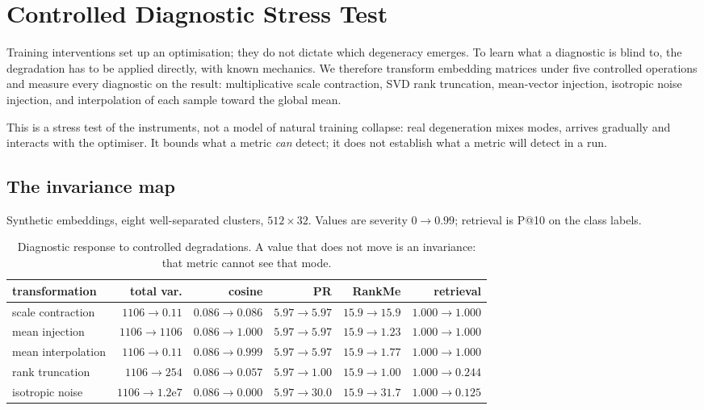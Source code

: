 \section{Controlled Diagnostic Stress Test}
\label{sec:stress}

Training interventions set up an optimisation; they do not dictate which degeneracy
emerges. To learn what a diagnostic is blind to, the degradation has to be applied
directly, with known mechanics. We therefore transform embedding matrices under five
controlled operations and measure every diagnostic on the result: multiplicative scale
contraction, SVD rank truncation, mean-vector injection, isotropic noise injection, and
interpolation of each sample toward the global mean.

\interp{} This is a stress test of the instruments, not a model of natural training
collapse: real degeneration mixes modes, arrives gradually and interacts with the
optimiser. It bounds what a metric \emph{can} detect; it does not establish what a metric
will detect in a run.

\subsection{The invariance map}

Synthetic embeddings, eight well-separated clusters, $512 \times 32$. Values are severity
$0 \to 0.99$; retrieval is P@10 on the class labels.

\begin{table}[h]
\centering
\small
\begin{tabular}{l r r r r r}
\toprule
\textbf{transformation} & \textbf{total var.} & \textbf{cosine} & \textbf{PR} &
\textbf{RankMe} & \textbf{retrieval} \\
\midrule
scale contraction  & $1106 \to 0.11$      & $0.086 \to 0.086$ & $5.97 \to 5.97$  & $15.9 \to 15.9$ & $1.000 \to 1.000$ \\
mean injection     & $1106 \to 1106$      & $0.086 \to 1.000$ & $5.97 \to 5.97$  & $15.9 \to 1.23$ & $1.000 \to 1.000$ \\
mean interpolation & $1106 \to 0.11$      & $0.086 \to 0.999$ & $5.97 \to 5.97$  & $15.9 \to 1.77$ & $1.000 \to 1.000$ \\
rank truncation    & $1106 \to 254$       & $0.086 \to 0.057$ & $5.97 \to 1.00$  & $15.9 \to 1.00$ & $1.000 \to 0.244$ \\
isotropic noise    & $1106 \to 1.2\mathrm{e}7$ & $0.086 \to 0.000$ & $5.97 \to 30.0$ & $15.9 \to 31.7$ & $1.000 \to 0.125$ \\
\bottomrule
\end{tabular}
\caption{\ours{} Diagnostic response to controlled degradations. A value that does not
move is an invariance: that metric cannot see that mode.}
\end{table}

